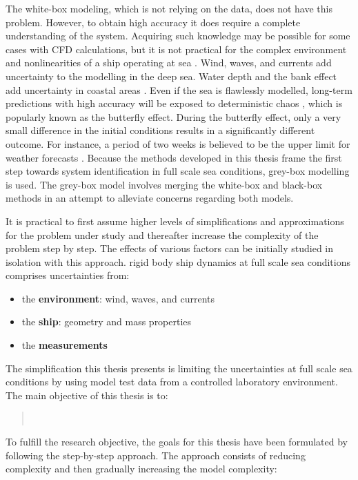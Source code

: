 The white-box modeling, which is not relying on the data, does not have this problem. However, to obtain high accuracy it does require a complete understanding of the system. Acquiring such knowledge may be possible for some cases with CFD calculations, but it is not practical for the complex environment and nonlinearities of a ship operating at sea \cite{miller_ship_2021}. 
Wind, waves, and currents add uncertainty to the modelling in the deep sea. Water depth and the bank effect add uncertainty in coastal areas \cite{nielsen_machine_2022}. 
Even if the sea is flawlessly modelled, long-term predictions with high accuracy will be exposed to deterministic chaos \cite{lorenz_deterministic_1963}, which is popularly known as the butterfly effect. During the butterfly effect, only a very small difference in the initial conditions results in a significantly different outcome. For instance, a period of two weeks is believed to be the upper limit for weather forecasts  \cite{zhang_what_2019}. Because the methods developed in this thesis frame the first step towards system identification in full scale sea conditions, grey-box modelling is used. The grey-box model involves merging the white-box and black-box methods in an attempt to alleviate concerns regarding both models. 

It is practical to first assume higher levels of simplifications and approximations for the problem under study and thereafter increase the complexity of the problem step by step. The effects of various factors can be initially studied in isolation with this approach. 
rigid body ship dynamics at full scale sea conditions comprises uncertainties from:
\vspace{5pt}
\begin{itemize}
    \setlength\itemsep{5pt}
    \item the \textbf{environment}: wind, waves, and currents
    \item the \textbf{ship}: geometry and mass properties
    \item the \textbf{measurements}
\end{itemize}
\vspace{5pt}

\noindent The simplification this thesis presents is limiting the uncertainties at full scale sea conditions by using model test data from a controlled laboratory environment. The main objective of this thesis is to:
\begin{quote}
\vspace{0.1cm}
\objective \\
\vspace{-0.3cm}
\end{quote}
To fulfill the research objective, the goals for this thesis have been formulated by following the step-by-step approach. The approach consists of reducing complexity and then gradually increasing the model complexity:

